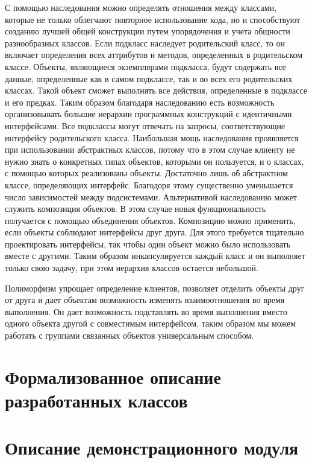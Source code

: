 \documentclass[russian,utf8,simple,hpadding=10mm,vpadding=20mm]{eskdtext}
\begin{document}
С помощью наследования можно определять отношения между классами, которые не только облегчают повторное использование кода, но и способствуют созданию лучшей общей конструкции путем упорядочения и учета общности разнообразных классов.
Если подкласс наследует родительский класс, то он включает определения всех
аттрибутов и методов, определенных в родительском классе. Объекты, являющиеся экземплярами подкласса, будут содержать все данные, определенные как в самом подклассе, так и во всех его родительских классах. Такой объект сможет выполнять все действия, определенные в подклассе и его предках. Таким образом благодаря наследованию есть возможность организовывать большие иерархии программных конструкций с идентичными интерфейсами. Все
подклассы могут отвечать на запросы, соответствующие интерфейсу родительского класса. Наибольшая мощь наследования проявляется при использовании абстрактных классов, потому что в этом случае клиенту не нужно знать о конкретных типах объектов, которыми он пользуется,  и о классах, с помощью которых реализованы объекты. Достаточно лишь об абстрактном классе, определяющих интерфейс. Благодоря этому существенно уменьшается число зависимостей между подсистемами. Альтернативой наследованию может служить композиция объектов. В этом случае новая функциональность получается с помощью объединения объектов. Композицию можно применить, если объекты соблюдают интерфейсы друг друга. Для этого требуется тщательно проектировать интерфейсы, так чтобы один объект можно было использовать вместе с другими. Таким образом инкапсулируется каждый класс и он выполняет только свою задачу, при этом иерархия классов остается небольшой.

Полиморфизм упрощает определение клиентов, позволяет отделить объекты друг от друга и дает объектам возможность изменять взаимоотношения во время выполнения. Он дает возможность подставлять во время выполнения вместо одного объекта другой с совместимым интерфейсом, таким образом мы можем работать с группами связанных объектов универсальным способом.

\newpage
\parindent=15mm
\linespread{1,5}
\section{Формализованное описание разработанных классов}

\newpage
\parindent=15mm
\linespread{1,5}
\section{Описание демонстрационного модуля}
\end{document}
